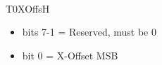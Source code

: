 \\
T0XOffsH
\begin{itemize}
\item bits 7-1 = Reserved, must be 0
\item bit 0 = X-Offset MSB
\end{itemize}

